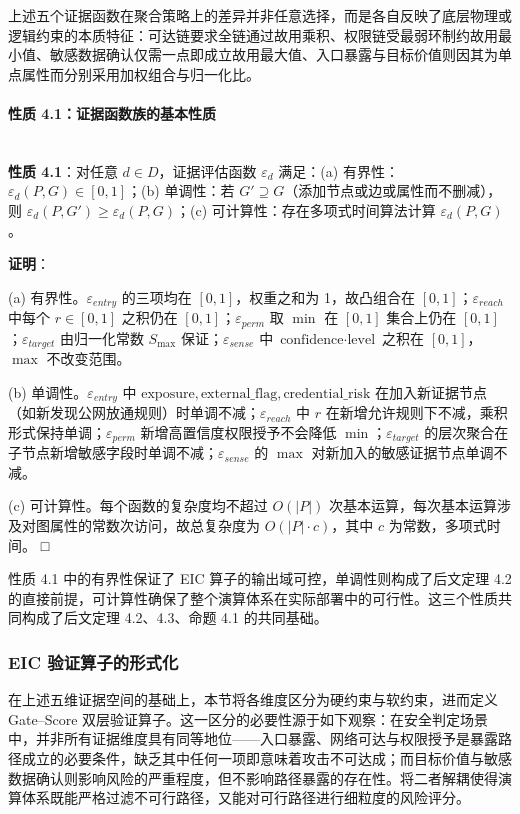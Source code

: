 \documentclass[a4paper,12pt]{ctexart}
\begin{document}
上述五个证据函数在聚合策略上的差异并非任意选择，而是各自反映了底层物理或逻辑约束的本质特征：可达链要求全链通过故用乘积、权限链受最弱环制约故用最小值、敏感数据确认仅需一点即成立故用最大值、入口暴露与目标价值则因其为单点属性而分别采用加权组合与归一化比。

\paragraph{性质 4.1：证据函数族的基本性质}\mbox{}\\

\textbf{性质 4.1}：对任意 $d \in D$，证据评估函数 $\varepsilon_d$ 满足：(a) 有界性：$\varepsilon_d(P, G) \in [0, 1]$；(b) 单调性：若 $G' \supseteq G$（添加节点或边或属性而不删减），则 $\varepsilon_d(P, G') \geq \varepsilon_d(P, G)$；(c) 可计算性：存在多项式时间算法计算 $\varepsilon_d(P, G)$。

\textbf{证明}：

(a) 有界性。$\varepsilon_{entry}$ 的三项均在 $[0,1]$，权重之和为 1，故凸组合在 $[0,1]$；$\varepsilon_{reach}$ 中每个 $r \in [0,1]$ 之积仍在 $[0,1]$；$\varepsilon_{perm}$ 取 $\min$ 在 $[0,1]$ 集合上仍在 $[0,1]$；$\varepsilon_{target}$ 由归一化常数 $S_{\max}$ 保证；$\varepsilon_{sense}$ 中 $\text{confidence} \cdot \text{level}$ 之积在 $[0,1]$，$\max$ 不改变范围。

(b) 单调性。$\varepsilon_{entry}$ 中 $\text{exposure}, \text{external\_flag}, \text{credential\_risk}$ 在加入新证据节点（如新发现公网放通规则）时单调不减；$\varepsilon_{reach}$ 中 $r$ 在新增允许规则下不减，乘积形式保持单调；$\varepsilon_{perm}$ 新增高置信度权限授予不会降低 $\min$；$\varepsilon_{target}$ 的层次聚合在子节点新增敏感字段时单调不减；$\varepsilon_{sense}$ 的 $\max$ 对新加入的敏感证据节点单调不减。

(c) 可计算性。每个函数的复杂度均不超过 $O(|P|)$ 次基本运算，每次基本运算涉及对图属性的常数次访问，故总复杂度为 $O(|P| \cdot c)$，其中 $c$ 为常数，多项式时间。 □

性质 4.1 中的有界性保证了 EIC 算子的输出域可控，单调性则构成了后文定理 4.2 的直接前提，可计算性确保了整个演算体系在实际部署中的可行性。这三个性质共同构成了后文定理 4.2、4.3、命题 4.1 的共同基础。

\subsubsection{EIC 验证算子的形式化}

在上述五维证据空间的基础上，本节将各维度区分为硬约束与软约束，进而定义 Gate–Score 双层验证算子。这一区分的必要性源于如下观察：在安全判定场景中，并非所有证据维度具有同等地位——入口暴露、网络可达与权限授予是暴露路径成立的必要条件，缺乏其中任何一项即意味着攻击不可达成；而目标价值与敏感数据确认则影响风险的严重程度，但不影响路径暴露的存在性。将二者解耦使得演算体系既能严格过滤不可行路径，又能对可行路径进行细粒度的风险评分。
\end{document}
